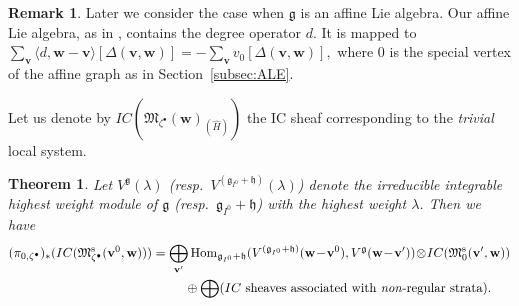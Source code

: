\documentclass[pdftex]{sigma}
\newtheorem{Theorem}[equation]{Theorem}
\theoremstyle{definition}
\newtheorem{Remark}[equation]{Remark}
\numberwithin{equation}{section}
\newcommand{\subsecref}[1]{Section~\ref{#1}}
\newcommand{\g}{{\mathfrak g}}
\newcommand{\Hom}{\operatorname{Hom}}
\newcommand{\M}{{\mathfrak M}} %
\newcommand{\Mreg}{\M^{\operatorname{s}}}
\newcommand{\bv}{{\mathbf v}} %
\newcommand{\bw}{{\mathbf w}} %
\begin{document}
\begin{Remark}\label{rem:degree}
  Later we consider the case when $\g$ is an af\/f\/ine Lie algebra. Our
  af\/f\/ine Lie algebra, as in \cite{Kac}, contains the degree operator
  $d$. It is mapped to
\(
   \sum_\bv \langle d, \bw - \bv\rangle [\Delta(\bv,\bw)]
   = - \sum_{\bv} v_0[\Delta(\bv,\bw)],
\)
where $0$ is the special vertex of the af\/f\/ine graph as in
\subsecref{subsec:ALE}.
\end{Remark}

Let us denote by $IC(\M_{\zeta^\bullet}(\bw)_{(\widehat H)})$ the IC
sheaf corresponding to the {\it trivial\/} local system.

\begin{Theorem}\label{thm:branch}
  Let $V^\g(\lambda)$ \textup(resp.\ $V^{(\g_{I^0}+\mathfrak
    h)}(\lambda)$\textup) denote the irreducible integrable highest
  weight module of $\g$ \textup(resp.\ $\g_{I^0}+\mathfrak h$\textup)
  with the highest weight $\lambda$. Then we have
  \begin{gather*}
    (\pi_{0,\zeta^\bullet})_*(IC(\Mreg_{\zeta^\bullet}(\bv^0,\bw)))
   =
    \bigoplus_{\bv'}
    \Hom_{\g_{I^0}+\mathfrak
    h}(V^{(\g_{I^0}+\mathfrak h)}(\bw \!-\! \bv^0), V^\g(\bw\!-\!\bv'))
  \!\otimes\! IC(\Mreg_0(\bv',\bw))
  \\
  \phantom{(\pi_{0,\zeta^\bullet})_*(IC(\Mreg_{\zeta^\bullet}(\bv^0,\bw)))=}{} \oplus
  \bigoplus (\text{\rm
    $IC$ sheaves associated with {\it non\/}-regular strata}).
  \end{gather*}
\end{Theorem}
\end{document}
